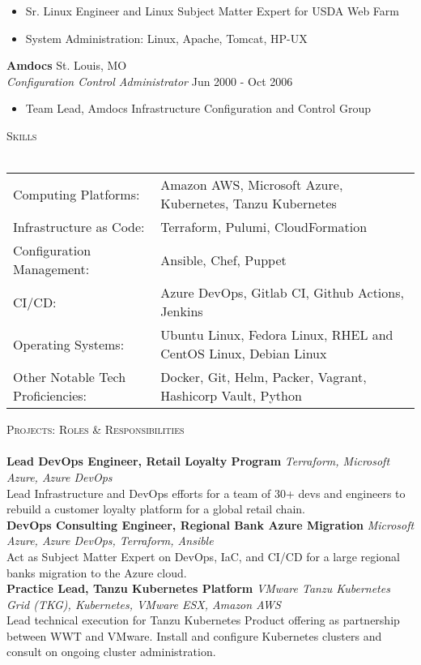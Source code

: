 \documentclass[a4paper]{article}
\newcommand{\lineunder} {
    \vspace*{-8pt} \\
    \hspace*{-18pt} \hrulefill \\
}
\newcommand{\header} [1] {
    {\hspace*{-18pt}\vspace*{6pt} \textsc{#1}}
    \vspace*{-6pt} \lineunder
}
\begin{document}
\begin{itemize} \itemsep 1pt
	\item Sr. Linux Engineer and Linux Subject Matter Expert for USDA Web Farm
	\item System Administration: Linux, Apache, Tomcat, HP-UX
\end{itemize}
\textbf{Amdocs} \hfill St. Louis, MO\\
\textit{Configuration Control Administrator} \hfill Jun 2000 - Oct 2006\\
\vspace{-1mm}
\begin{itemize} \itemsep 1pt
	\item Team Lead, Amdocs Infrastructure Configuration and Control Group
\end{itemize}

\header{Skills}
\begin{tabular}{ l l }
	Computing Platforms:              & Amazon AWS, Microsoft Azure, Kubernetes, Tanzu Kubernetes       \\
	Infrastructure as Code:           & Terraform, Pulumi, CloudFormation                               \\
	Configuration Management:         & Ansible, Chef, Puppet                                           \\
	CI/CD:                            & Azure DevOps, Gitlab CI, Github Actions, Jenkins                \\
	Operating Systems:                & Ubuntu Linux, Fedora Linux, RHEL and CentOS Linux, Debian Linux \\
	Other Notable Tech Proficiencies: & Docker, Git, Helm, Packer, Vagrant, Hashicorp Vault, Python     \\
\end{tabular}
\vspace{2mm}

\header{Projects: Roles \& Responsibilities}
{\textbf{Lead DevOps Engineer, Retail Loyalty Program}} {\sl Terraform, Microsoft Azure, Azure DevOps} \\
Lead Infrastructure and DevOps efforts for a team of 30+ devs and engineers to rebuild a customer loyalty platform for a global retail chain.\\
\vspace*{2mm}
{\textbf{DevOps Consulting Engineer, Regional Bank Azure Migration}} {\sl Microsoft Azure, Azure DevOps, Terraform, Ansible} \\
Act as Subject Matter Expert on DevOps, IaC, and CI/CD for a large regional bank\textquotesingle{}s migration to the Azure cloud.\\
\vspace*{2mm}
{\textbf{Practice Lead, Tanzu Kubernetes Platform}} {\sl VMware Tanzu Kubernetes Grid (TKG), Kubernetes, VMware ESX, Amazon AWS} \\
Lead technical execution for Tanzu Kubernetes Product offering as partnership between WWT and VMware. Install and configure Kubernetes clusters and consult on ongoing cluster administration.\\
\vspace*{2mm}
\end{document}
